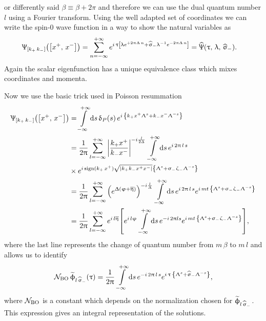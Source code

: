 or differently said $\beta \equiv \beta + 2 \pi$ and therefore we can use the dual quantum number $l$ using a Fourier transform.
Using the well adapted set of coordinates we can write the spin-0 wave function in a way to show the natural variables as
\begin{equation}
  \begin{split}
    \Psi_{\qty[k_+\, k_-]}\qty(\qty[x^+,\, x^-])
    & =
    \infinfsum{n}
    e^{%
      i\, \tau \qty[%
        \lambda e^{+2\pi\Delta\,n}
        +
        \hsigma_- \lambda^{-1} e^{ -2\pi\Delta\,n} 
      ]
    }  
    =
    \hPsi\qty(\tau,\, \lambda,\, \hsigma_-).
  \end{split}
  \label{eq:BO_PSI0_tau_lambda}
\end{equation}
Again the scalar eigenfunction has a unique equivalence class which mixes
coordinates and momenta.

Now we use the basic trick used in Poisson resummation
\begin{equation}
  \begin{split}
    \Psi_{\qty[k_+\, k_-]}\qty(\qty[x^+,\, x^-])
    & =
    \infinfint{s}
    \delta_P(s)\,
    e^{%
      i\, \qty{%
        k_+  x^+ \Lambda^s
        +
        k_-  x^- \Lambda^{-s}
      }
    }
    \\
    & =
    \frac{1}{2\pi}
    \infinfsum{l}
    \abs{\frac{k_+ x^+}{k_- x^-}}^{-i \frac{l}{2 \Delta} }\,
    \infinfint{s}
    e^{i\, 2 \pi\, l\, s}
    \\
    & \times
    e^{i\, \sgn(k_+\, x^+) \sqrt{\abs{k_+ k_- x^+ x^-}}
      \qty{
        \Lambda^s
        +
        \sigma_- \zeta_- \Lambda^{-s}
      }
    }
    \\
    & =
    \frac{1}{2\pi}
    \infinfsum{l}
    \qty( e^{\Delta \qty( \varphi + \beta )} )^{-i \frac{l}{\Delta}}\,
    \infinfint{s}
    e^{i\, 2 \pi\, l\, s}
    e^{%
      i\, m t\, \qty{
        \Lambda^s
        +
        \sigma_- \zeta_- \Lambda^{-s}
      }
    }
    \\
    & =
    \frac{1}{2\pi}
    \infinfsum{l}
    e^{i\, l \beta}
    \qty[%
      e^{i\, l \varphi}\,
      \infinfint{s}
      e^{-i\, 2\pi l s}
      e^{%
        i\, m t\, \qty{
          \Lambda^s
          +
          \sigma_- \zeta_- \Lambda^{-s}
        }
      }
    ],    
  \end{split}
\end{equation}
where the last line represents the change of quantum number from $m\, \beta$ to $m\, l$ and allows us to identify
\begin{equation}
  \cN_{\text{BO}}\,
  \tphi_{\lsi}(\tau)
  =
  \frac{1}{2\pi}\,
  \infinfint{s}
  e^{-i\, 2 \pi\, l\, s}
  e^{%
    i\, \tau\, \qty{
      \Lambda^s
      +
      \hsigma_- \Lambda^{-s}
    }
  },    
\end{equation}
where $\mathcal{N}_{\text{BO}}$ is a constant which depends on the normalization chosen for $\widetilde{\upphi}_{l\, \widehat{\upsigma}_-}$. 
This expression gives an integral representation of the \ode solutions.


